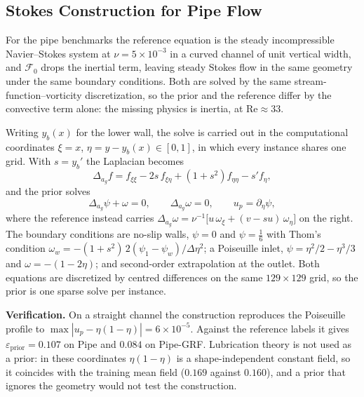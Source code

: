 \documentclass{article}
\begin{document}
\subsection{Stokes Construction for Pipe Flow}
\label{app:stokes-representation}

For the pipe benchmarks the reference equation is the steady incompressible
Navier--Stokes system at $\nu=5\times10^{-3}$ in a curved channel of unit vertical width,
and $\mathcal{F}_0$ drops the inertial term, leaving steady Stokes flow in the same
geometry under the same boundary conditions. Both are solved by the same
stream-function--vorticity discretization, so the prior and the reference differ by the
convective term alone: the missing physics is inertia, at $\mathrm{Re}\approx33$.

Writing $y_b(x)$ for the lower wall, the solve is carried out in the computational
coordinates $\xi=x$, $\eta=y-y_b(x)\in[0,1]$, in which every instance shares one grid. With
$s=y_b'$ the Laplacian becomes
\begin{equation}
\Delta_{a_g} f
=
f_{\xi\xi}-2s\,f_{\xi\eta}+(1+s^2)f_{\eta\eta}-s'f_{\eta},
\label{eq:app-stokes-metric}
\end{equation}
and the prior solves
\begin{equation}
\Delta_{a_g}\psi+\omega=0,
\qquad
\Delta_{a_g}\omega=0,
\qquad
u_p=\partial_\eta\psi,
\label{eq:app-stokes-system}
\end{equation}
where the reference instead carries
$\Delta_{a_g}\omega=\nu^{-1}\bigl[u\,\omega_\xi+(v-su)\,\omega_\eta\bigr]$ on the right.
The boundary conditions are no-slip walls, $\psi=0$ and $\psi=\tfrac16$ with Thom's
condition $\omega_w=-(1+s^2)\,2(\psi_1-\psi_w)/\Delta\eta^2$; a Poiseuille inlet,
$\psi=\eta^2/2-\eta^3/3$ and $\omega=-(1-2\eta)$; and second-order extrapolation at the
outlet. Both equations are discretized by centred differences on the same
$129\times129$ grid, so the prior is one sparse solve per instance.

\textbf{Verification.} On a straight channel the construction reproduces the Poiseuille
profile to $\max|u_p-\eta(1-\eta)|=6\times10^{-5}$. Against the reference labels it gives
$\varepsilon_{\mathrm{prior}}=0.107$ on Pipe and $0.084$ on Pipe-GRF. Lubrication theory is
not used as a prior: in these coordinates $\eta(1-\eta)$ is a shape-independent constant
field, so it coincides with the training mean field ($0.169$ against $0.160$), and a prior
that ignores the geometry would not test the construction.
\end{document}
